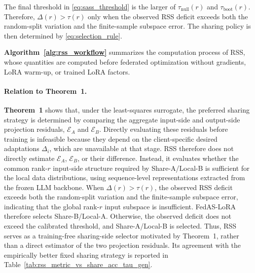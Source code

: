 \documentclass[lettersize,journal]{IEEEtran}
\begin{document}
	The final threshold in \eqref{eq:sass_threshold} is the larger of $\tau_{\mathrm{null}}(r)$ and $\tau_{\mathrm{boot}}(r)$. Therefore, $\Delta(r)>\tau(r)$ only when the observed RSS deficit exceeds both the random-split variation and the finite-sample subspace error. The sharing policy is then determined by \eqref{eq:selection_rule}.
	
	\textbf{Algorithm~\ref{alg:rss_workflow}} summarizes the computation process of RSS, whose quantities are computed before federated optimization without gradients, LoRA warm-up, or trained LoRA factors.
	
	{\color{black}\paragraph{Relation to Theorem~1.}
		\textbf{Theorem~1} shows that, under the least-squares surrogate, the preferred sharing strategy is determined by comparing the aggregate input-side and output-side projection residuals, $\mathcal{E}_A$ and $\mathcal{E}_B$. Directly evaluating these residuals before training is infeasible because they depend on the client-specific desired adaptations $\Delta_i$, which are unavailable at that stage. RSS therefore does not directly estimate $\mathcal{E}_A$, $\mathcal{E}_B$, or their difference. Instead, it evaluates whether the common rank-$r$ input-side structure required by Share-A/Local-B is sufficient for the local data distributions, using sequence-level representations extracted from the frozen LLM backbone. When $\Delta(r)>\tau(r)$, the observed RSS deficit exceeds both the random-split variation and the finite-sample subspace error, indicating that the global rank-$r$ input subspace is insufficient. FedAS-LoRA therefore selects Share-B/Local-A. Otherwise, the observed deficit does not exceed the calibrated threshold, and Share-A/Local-B is selected. Thus, RSS serves as a training-free sharing-side selector motivated by Theorem~1, rather than a direct estimator of the two projection residuals. Its agreement with the empirically better fixed sharing strategy is reported in Table~\ref{tab:rss_metric_vs_share_acc_tau_gen}.}
\end{document}
